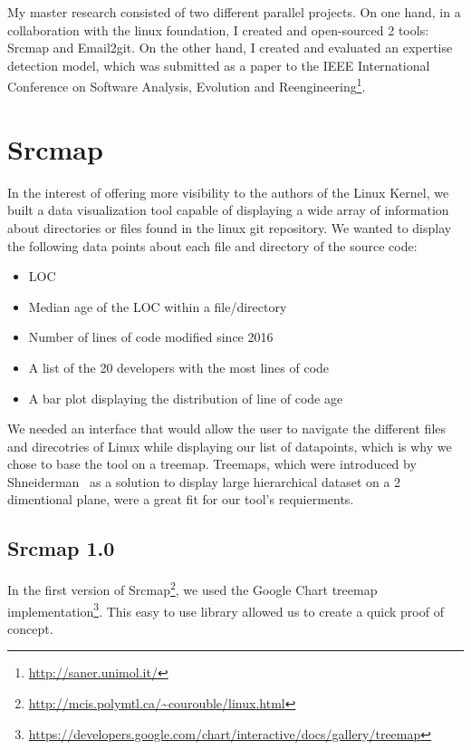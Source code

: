 \label{sec:Theme1}

My master research consisted of two different parallel projects. On one hand, in a collaboration with the linux foundation, I created and open-sourced 2 tools: Srcmap and Email2git. On the other hand, I created and evaluated an expertise detection model, which was submitted as a paper to the IEEE International Conference on Software Analysis, Evolution and Reengineering\footnote{\url{http://saner.unimol.it/}}.


\section{Srcmap}

In the interest of offering more visibility to the authors of the Linux Kernel, we built a data visualization tool capable of displaying a wide array of information about directories or files found in the linux git repository. We wanted to display the following data points about each file and directory of the source code:

\begin{itemize}
	\item \ac{LOC}
	\item Median age of the \ac{LOC} within a file/directory
	\item Number of lines of code modified since 2016
	\item A list of the 20 developers with the most lines of code
	\item A bar plot displaying the distribution of line of code age
\end{itemize}

We needed an interface that would allow the user to navigate the different files and direcotries of Linux while displaying our list of datapoints, which is why we chose to base the tool on a treemap. Treemaps, which were introduced by Shneiderman~\citep{Bederson-2002} as a solution to display large hierarchical dataset on a 2 dimentional plane, were a great fit for our tool's requierments. 

\subsection{Srcmap 1.0}

In the first version of Srcmap\footnote{\url{http://mcis.polymtl.ca/~courouble/linux.html}}, we used the Google Chart treemap implementation\footnote{\url{https://developers.google.com/chart/interactive/docs/gallery/treemap}}. This easy to use library allowed us to create a quick proof of concept. 

